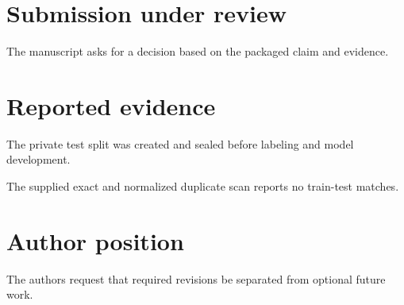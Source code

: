 \documentclass{article}
\begin{document}
\section{Submission under review}
The manuscript asks for a decision based on the packaged claim and evidence.
\section{Reported evidence}
The private test split was created and sealed before labeling and model development.

The supplied exact and normalized duplicate scan reports no train-test matches.
\section{Author position}
The authors request that required revisions be separated from optional future work.
\end{document}
